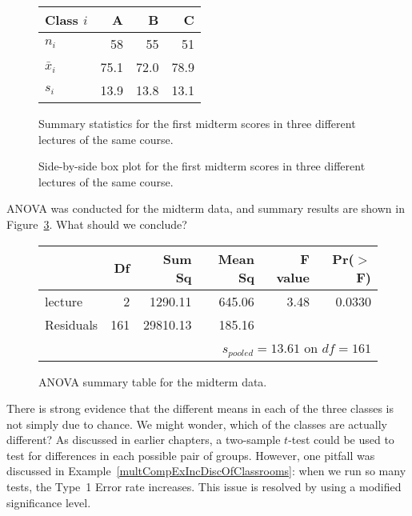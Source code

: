 \begin{figure}[h]
\centering
\begin{tabular}{lrrr}
  \hline
Class $i$	& A	& B	& C \\ 
  \hline
$n_i$		& 58	& 55	& 51 \\ 
$\bar{x}_i$	& 75.1	& 72.0	& 78.9 \\ 
$s_i$		& 13.9	& 13.8	& 13.1 \\ 
\hline
\end{tabular}
\caption{Summary statistics for the first midterm scores
    in three different lectures of the same course.}
\label{summaryStatisticsForClassTestData}
\end{figure}

\begin{figure}[h]
  \centering
  \caption{Side-by-side box plot for the first midterm
      scores in three different  lectures of the same course.}
  \label{classDataSBSBoxPlot}
\end{figure}

\begin{exercisewrap}
\begin{nexercise}
\label{exerExaminingAnovaSummaryTableForMidtermData}%
ANOVA was conducted for the midterm data,
and summary results are shown in
Figure~\ref{anovaSummaryTableForMidtermData}.
What should we conclude?\footnotemark{}
\end{nexercise}
\end{exercisewrap}

\begin{figure}[h]
\centering
\begin{tabular}{lrrrrr}
  \hline
 & Df & Sum Sq & Mean Sq & F value & Pr($>$F) \\ 
  \hline
lecture & 2 & 1290.11 & 645.06 & 3.48 & 0.0330 \\ 
  Residuals & 161 & 29810.13 & 185.16 &  &  \\ 
   \hline
\multicolumn{6}{r}{$s_{pooled}=13.61$ on $df=161$}
\end{tabular}
\caption{ANOVA summary table for the midterm data.}
\label{anovaSummaryTableForMidtermData}
\end{figure}

There is strong evidence that the different means in each
of the three classes is not simply due to chance.
We might wonder, which of the classes are actually different?
As discussed in earlier chapters, a two-sample $t$-test
could be used to test for differences in each possible pair
of groups.
However, one pitfall was discussed in
Example~\vref{multCompExIncDiscOfClassrooms}:
when we run so many tests, the Type~1 Error rate increases.
This issue is resolved by using a modified significance level.

